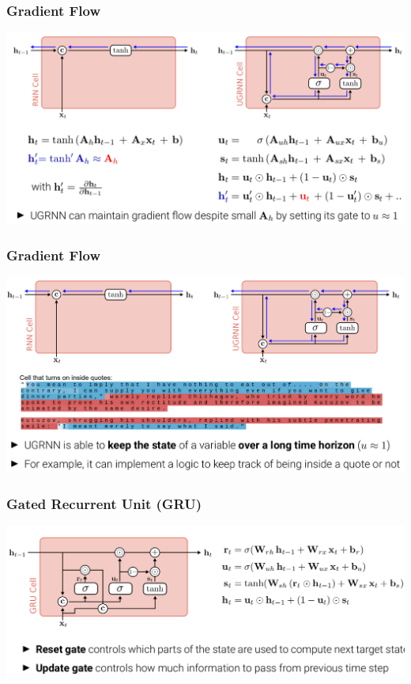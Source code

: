 \documentclass[10pt]{beamer}
\begin{document}
\begin{frame}
  \frametitle{Gradient Flow}
\begin{center}
\includegraphics[width=.95\textwidth]{images/s18}
\end{center}
\end{frame}

\begin{frame}
  \frametitle{Gradient Flow}
\begin{center}
\includegraphics[width=.95\textwidth]{images/s19}
\end{center}
\end{frame}

\begin{frame}
  \frametitle{Gated Recurrent Unit (GRU)}
\begin{center}
\includegraphics[width=.9\textwidth]{images/s20}
\end{center}
\end{frame}
\end{document}
